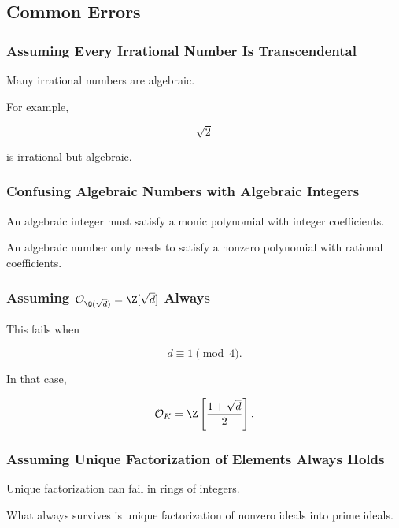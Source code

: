 \subsection{Common Errors}
\label{subsec:algebraic-number-theory-common-errors}

\subsubsection{Assuming Every Irrational Number Is Transcendental}

Many irrational numbers are algebraic.

For example,

\[ \sqrt2 \]

is irrational but algebraic.

\subsubsection{Confusing Algebraic Numbers with Algebraic Integers}

An algebraic integer must satisfy a monic polynomial with integer
coefficients.

An algebraic number only needs to satisfy a nonzero polynomial with rational
coefficients.

\subsubsection{Assuming \(\mathcal O_{\Q(\sqrt d)}=\Z[\sqrt d]\) Always}

This fails when

\[ d\equiv1\pmod4. \]

In that case,

\[ \mathcal O_K=\Z\left[\frac{1+\sqrt d}{2}\right]. \]

\subsubsection{Assuming Unique Factorization of Elements Always Holds}

Unique factorization can fail in rings of integers.

What always survives is unique factorization of nonzero ideals into prime
ideals.

